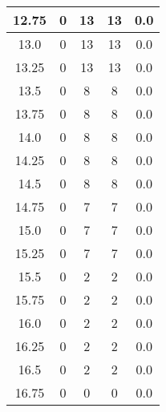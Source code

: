 \documentclass[letterpaper, 12pt]{article}
\begin{document}
\begin{longtable}{|c|c|c|c|c|}
\hline
12.75 & 0 & 13 & 13 & 0.0 \\
\hline
13.0 & 0 & 13 & 13 & 0.0 \\
\hline
13.25 & 0 & 13 & 13 & 0.0 \\
\hline
13.5 & 0 & 8 & 8 & 0.0 \\
\hline
13.75 & 0 & 8 & 8 & 0.0 \\
\hline
14.0 & 0 & 8 & 8 & 0.0 \\
\hline
14.25 & 0 & 8 & 8 & 0.0 \\
\hline
14.5 & 0 & 8 & 8 & 0.0 \\
\hline
14.75 & 0 & 7 & 7 & 0.0 \\
\hline
15.0 & 0 & 7 & 7 & 0.0 \\
\hline
15.25 & 0 & 7 & 7 & 0.0 \\
\hline
15.5 & 0 & 2 & 2 & 0.0 \\
\hline
15.75 & 0 & 2 & 2 & 0.0 \\
\hline
16.0 & 0 & 2 & 2 & 0.0 \\
\hline
16.25 & 0 & 2 & 2 & 0.0 \\
\hline
16.5 & 0 & 2 & 2 & 0.0 \\
\hline
16.75 & 0 & 0 & 0 & 0.0 \\
\hline
\end{longtable}
\end{document}
